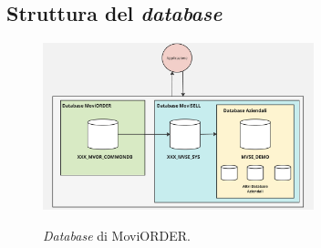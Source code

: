 \subsection{Struttura del \textit{database}}\label{chap:struttura database}

\begin{figure}[H]
    \centering
    \includegraphics[alt={\textit{Database} di MoviORDER}, width=0.7\textwidth]{img/database.jpg}
    \caption {\textit{Database} di MoviORDER.}
    \label{fig:database}
\end{figure}

